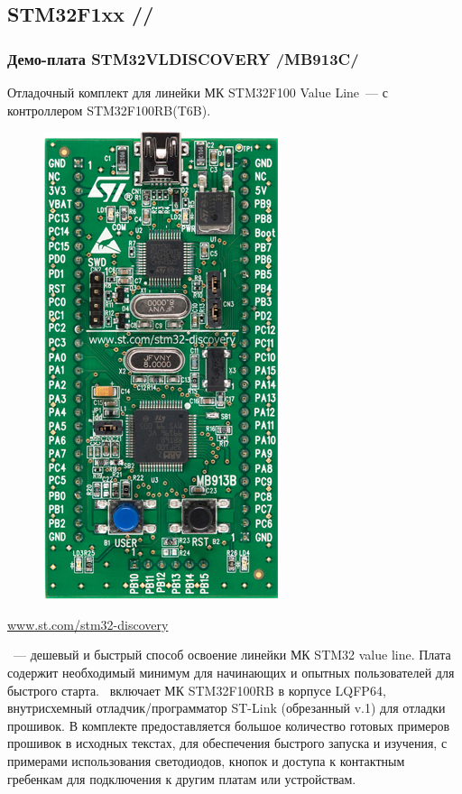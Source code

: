 \subsection{STM32F1xx //} \label{stm32f1}

\subsubsection{Демо-плата STM32VLDISCOVERY /MB913C/}

Отладочный комплект для линейки МК STM32F100 Value 
Line\ --- с контроллером STM32F100RB(T6B).

\begin{figure}
\includegraphics[height=0.7\textheight]{fig/STM32VLDISCOVERY.jpg}
\end{figure}

\url{www.st.com/stm32-discovery}
\bigskip

\vld\ --- дешевый и быстрый способ освоение линейки МК STM32 
value line. 
Плата содержит необходимый минимум для начинающих и опытных пользователей
для быстрого старта.
\vld\ включает МК STM32F100RB в корпусе LQFP64, внутрисхемный 
отладчик/программатор ST-Link (обрезанный v.1) для отладки прошивок.
В комплекте предоставляется большое количество готовых примеров прошивок
в исходных текстах, для обеспечения быстрого запуска и изучения, с примерами
использования светодиодов, кнопок и доступа к контактным гребенкам
для подключения к другим платам или устройствам.

